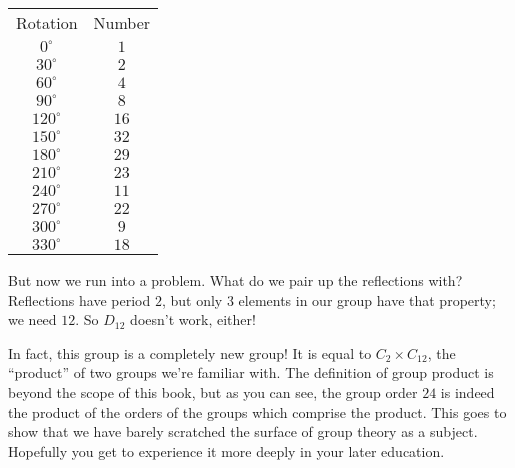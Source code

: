\documentclass[../gatm.tex]{subfiles}
\begin{document}
\begin{center}
\begin{tabular}{|c|c|}
Rotation & Number \\
$0^\circ$ & $1$ \\
$30^\circ$ & $2$ \\
$60^\circ$ & $4$ \\
$90^\circ$ & $8$ \\
$120^\circ$ & $16$ \\
$150^\circ$ & $32$ \\
$180^\circ$ & $29$ \\
$210^\circ$ & $23$ \\
$240^\circ$ & $11$ \\
$270^\circ$ & $22$ \\
$300^\circ$ & $9$ \\
$330^\circ$ & $18$ \\
\end{tabular}
\end{center}

But now we run into a problem. What do we pair up the reflections with? Reflections have period $2$, but only $3$ elements in our group have that property; we need $12$. So $D_{12}$ doesn't work, either!

In fact, this group is a completely new group! It is equal to $C_2\times C_{12}$, the ``product'' of two groups we're familiar with. The definition of group product is beyond the scope of this book, but as you can see, the group order $24$ is indeed the product of the orders of the groups which comprise the product. This goes to show that we have barely scratched the surface of group theory as a subject. Hopefully you get to experience it more deeply in your later education.
\end{document}
